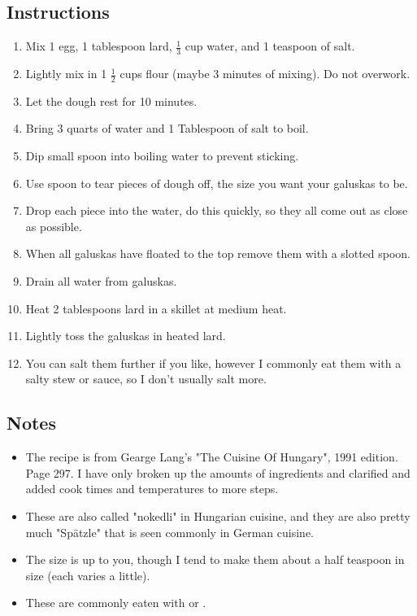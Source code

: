 \begin{multicols}{2}
\subsection*{Instructions}
\begin{enumerate}
    \item Mix 1 egg, 1 tablespoon lard, \( \frac{1}{3} \) cup water, and 1 teaspoon of salt.
    \item Lightly mix in 1 \( \frac{1}{2} \) cups flour (maybe 3 minutes of mixing). Do not overwork.
    \item Let the dough rest for 10 minutes.
    \item Bring 3 quarts of water and 1 Tablespoon of salt to boil.
    \item Dip small spoon into boiling water to prevent sticking.
    \item Use spoon to tear pieces of dough off, the size you want your galuskas to be.
    \item Drop each piece into the water, do this quickly, so they all come out as close as possible.
    \item When all galuskas have floated to the top remove them with a slotted spoon.
    \item Drain all water from galuskas.
    \item Heat 2 tablespoons lard in a skillet at medium heat.
    \item Lightly toss the galuskas in heated lard.
    \item You can salt them further if you like, however I commonly eat them with a salty stew or sauce, so I don't usually salt more.

\end{enumerate}

\subsection*{Notes}
\begin{itemize}
    \item The recipe is from Gearge Lang's "The Cuisine Of Hungary", 1991 edition. Page 297. I have only broken up the amounts of ingredients and clarified and added cook times and temperatures to more steps.
    \item These are also called "nokedli" in Hungarian cuisine, and they are also pretty much "Spätzle" that is seen commonly in German cuisine.
    \item The size is up to you, though I tend to make them about a half teaspoon in size (each varies a little).
    \item These are commonly eaten with  or .
\end{itemize}
\end{multicols}
\clearpage